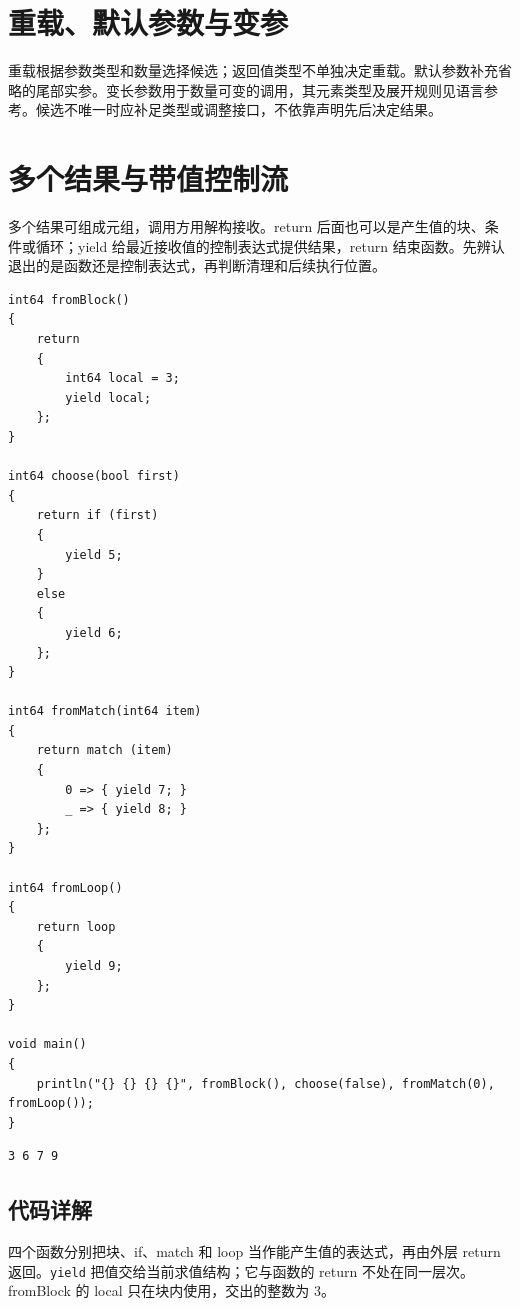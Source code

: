 \section{重载、默认参数与变参}

重载根据参数类型和数量选择候选；返回值类型不单独决定重载。默认参数补充省略的尾部实参。变长参数用于数量可变的调用，其元素类型及展开规则见语言参考。候选不唯一时应补足类型或调整接口，不依靠声明先后决定结果。

\section{多个结果与带值控制流}

多个结果可组成元组，调用方用解构接收。return 后面也可以是产生值的块、条件或循环；yield 给最近接收值的控制表达式提供结果，return 结束函数。先辨认退出的是函数还是控制表达式，再判断清理和后续执行位置。

\par
\medskip
\begin{lstlisting}[style=chali]
int64 fromBlock()
{
    return
    {
        int64 local = 3;
        yield local;
    };
}

int64 choose(bool first)
{
    return if (first)
    {
        yield 5;
    }
    else
    {
        yield 6;
    };
}

int64 fromMatch(int64 item)
{
    return match (item)
    {
        0 => { yield 7; }
        _ => { yield 8; }
    };
}

int64 fromLoop()
{
    return loop
    {
        yield 9;
    };
}

void main()
{
    println("{} {} {} {}", fromBlock(), choose(false), fromMatch(0), fromLoop());
}
\end{lstlisting}
\par
\medskip

\par
\medskip
\begin{lstlisting}[style=out]
3 6 7 9
\end{lstlisting}
\par
\medskip

\subsection*{代码详解}

四个函数分别把块、if、match 和 loop 当作能产生值的表达式，再由外层 return 返回。\texttt{yield} 把值交给当前求值结构；它与函数的 return 不处在同一层次。fromBlock 的 local 只在块内使用，交出的整数为 3。

